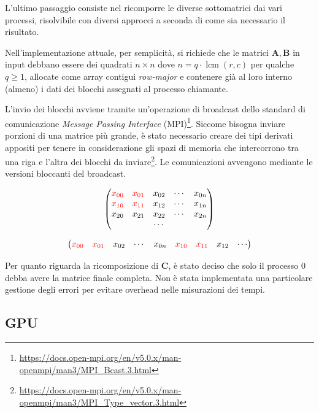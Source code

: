 \documentclass[a4paper]{article}
\DeclareMathOperator{\lcm}{lcm}
\begin{document}
L'ultimo passaggio consiste nel ricomporre le diverse sottomatrici dai vari processi, risolvibile con diversi approcci a seconda di come sia necessario il risultato.

\medskip Nell'implementazione attuale, per semplicità, si richiede che le matrici $\mathbf{A}, \mathbf{B}$ in input debbano essere dei quadrati $n \times n$ dove $n = q \cdot \lcm(r,c)$ per qualche $q \ge 1$, allocate come array contigui \textit{row-major} e contenere già al loro interno (almeno) i dati dei blocchi assegnati al processo chiamante.

L'invio dei blocchi avviene tramite un'operazione di broadcast dello standard di comunicazione \textit{Message Passing Interface} (MPI)\footnote{\url{https://docs.open-mpi.org/en/v5.0.x/man-openmpi/man3/MPI_Bcast.3.html}}.
Siccome bisogna inviare porzioni di una matrice più grande, è stato necessario creare dei tipi derivati appositi per tenere in considerazione gli spazi di memoria che intercorrono tra una riga e l'altra dei blocchi da inviare\footnote{\url{https://docs.open-mpi.org/en/v5.0.x/man-openmpi/man3/MPI_Type_vector.3.html}}.
Le comunicazioni avvengono mediante le versioni bloccanti del broadcast. %

$$
    \begin{pmatrix}
        \color{red} x_{00} & \color{red} x_{01} & x_{02} & \cdots & x_{0n} \\
        \color{red} x_{10} & \color{red} x_{11} & x_{12} & \cdots & x_{1n} \\
        x_{20}             & x_{21}             & x_{22} & \cdots & x_{2n} \\
                           &                    & \cdots &        &        \\
    \end{pmatrix}
$$

$$
    \begin{pmatrix}
        \color{red} x_{00} & \color{red} x_{01} & x_{02} & \cdots & x_{0n} & \color{red} x_{10} & \color{red} x_{11} & x_{12} & \cdots
    \end{pmatrix}
$$

Per quanto riguarda la ricomposizione di $\mathbf{C}$, è stato deciso che solo il processo 0 debba avere la matrice finale completa.
Non è stata implementata una particolare gestione degli errori per evitare overhead nelle misurazioni dei tempi.

\subsection{GPU}
\end{document}
